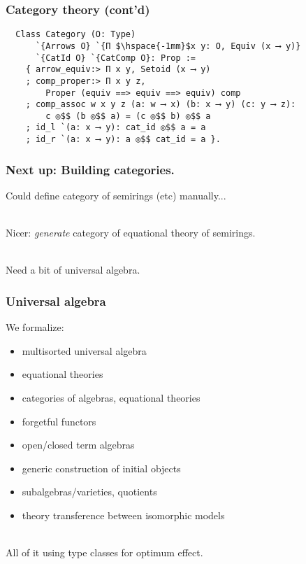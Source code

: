 \documentclass{beamer}
\begin{document}
\begin{frame}[fragile]
\frametitle{Category theory (cont'd)}
\begin{lstlisting}
  Class Category (O: Type)
      `{Arrows O} `{Π $\hspace{-1mm}$x y: O, Equiv (x ⟶ y)}
      `{CatId O} `{CatComp O}: Prop :=
    { arrow_equiv:> Π x y, Setoid (x ⟶ y)
    ; comp_proper:> Π x y z,
        Proper (equiv ==> equiv ==> equiv) comp
    ; comp_assoc w x y z (a: w ⟶ x) (b: x ⟶ y) (c: y ⟶ z):
        c ◎$$ (b ◎$$ a) = (c ◎$$ b) ◎$$ a
    ; id_l `(a: x ⟶ y): cat_id ◎$$ a = a
    ; id_r `(a: x ⟶ y): a ◎$$ cat_id = a }.
\end{lstlisting}


\end{frame}

\begin{frame}
\frametitle{Next up: Building categories.}

Could define category of semirings (etc) manually...

\ \\
Nicer: \emph{generate} category of equational theory of semirings.

\ \\
Need a bit of universal algebra.
\end{frame}

\begin{frame}
\frametitle{Universal algebra}
We formalize:
\begin{itemize}
\item multisorted universal algebra
\item equational theories
\item categories of algebras, equational theories
\item forgetful functors
\item open/closed term algebras
\item generic construction of initial objects
\item subalgebras/varieties, quotients
\item theory transference between isomorphic models
\end{itemize}

\ \\
All of it using type classes for optimum effect.
\end{frame}
\end{document}
